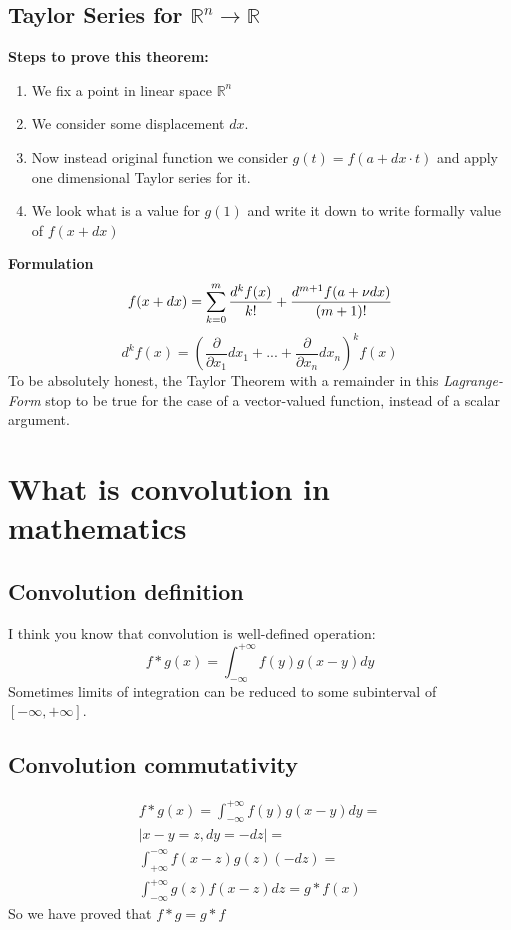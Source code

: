 \documentclass[12pt,a4paper]{article}
\theoremstyle{plain}
\begin{document}
\subsection{Taylor Series for $\mathbb{R}^n \to \mathbb{R}$}
\textbf{Steps to prove this theorem:}
\begin{enumerate}
\item We fix a point \textbf{} in linear space $\mathbb{R}^n$ 
\item We consider some displacement $dx$.
\item Now instead original function we consider $g(t)=f(a+dx \cdot t)$ and apply one dimensional Taylor series for it.
\item We look what is a value for $g(1)$ and write it down to write formally value of $f(x+dx)$ 
\end{enumerate}
\textbf{Formulation}
\begin{equation}
 f(x+dx)=\sum_{k=0}^{m}\dfrac{d^kf(x)}{k!}+\dfrac{d^{m+1}f(a+\nu dx)}{(m+1)!}\\
\end{equation}
\begin{equation}
 d^kf(x)=\left(\frac{\partial}{\partial x_1}dx_1+...+\frac{\partial}{\partial x_n}dx_n\right)^kf(x)
\end{equation}
To be absolutely honest, the Taylor Theorem with a remainder in this \textit{Lagrange-Form} stop to be true for the case of a vector-valued function, instead of a scalar argument.

\section{What is convolution in mathematics}
\subsection{Convolution definition}
I think you know that convolution is well-defined operation:
\begin{equation}\label{convolution}
f*g(x)=\int^{+\infty}_{-\infty} f(y)g(x-y)dy
\end{equation}
Sometimes limits of integration can be reduced to some subinterval of $[-\infty, +\infty]$.
\subsection{Convolution commutativity}
\begin{multline}\label{convolution_commutativity}
f*g(x)=\int^{+\infty}_{-\infty} f(y)g(x-y)dy=\\
|x-y=z,dy=-dz|=\\
\int^{-\infty}_{+\infty}  f(x-z)g(z)(-dz)=\\
\int^{+\infty}_{-\infty}  g(z)f(x-z)dz=g*f(x)
\end{multline}
So we have proved that $f*g=g*f$
\end{document}
